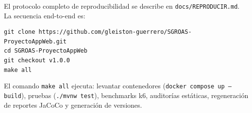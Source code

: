 El protocolo completo de reproducibilidad se describe en \texttt{docs/REPRODUCIR.md}. La secuencia end-to-end es:

\begin{verbatim}
git clone https://github.com/gleiston-guerrero/SGROAS-ProyectoAppWeb.git
cd SGROAS-ProyectoAppWeb
git checkout v1.0.0
make all
\end{verbatim}

El comando \texttt{make all} ejecuta: levantar contenedores (\texttt{docker compose up --build}), pruebas (\texttt{./mvnw test}), benchmarks k6, auditorías estáticas, regeneración de reportes JaCoCo y generación de versiones.
